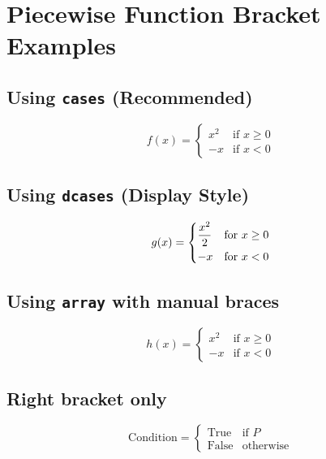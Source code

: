 \documentclass{article}
\begin{document}
\section*{Piecewise Function Bracket Examples}

\subsection*{Using \texttt{cases} (Recommended)}

$$f(x) = \begin{cases}
  x^2 & \text{if } x \geq 0 \\
  -x & \text{if } x < 0
\end{cases}$$

\subsection*{Using \texttt{dcases} (Display Style)}

$$g(x) = \begin{dcases}
  \frac{x^2}{2} & \text{for } x \geq 0 \\
  -x & \text{for } x < 0
\end{dcases}$$

\subsection*{Using \texttt{array} with manual braces}

$$h(x) = \left\{
\begin{array}{ll}
  x^2 & \text{if } x \geq 0 \\
  -x & \text{if } x < 0
\end{array}
\right.$$

\subsection*{Right bracket only}

$$\text{Condition} = \begin{cases}
  \text{True} & \text{if } P \\
  \text{False} & \text{otherwise}
\end{cases}$$
\end{document}
